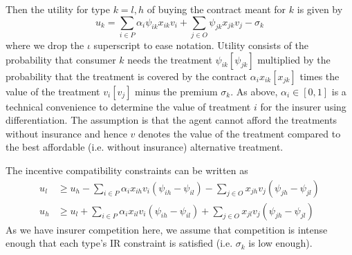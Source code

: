 \documentclass[12pt,english,a4paper]{article}
\begin{document}
Then the utility for type \(k=l,h\) of buying the contract meant for \(k\) is given by
\begin{equation}
\label{eq:11}
u_k = \sum_{i \in P} \alpha_i \psi_{ik} x_{ik} v_i + \sum_{j \in O} \psi_{jk} x_{jk} v_j - \sigma_k
\end{equation}
where we drop the \(\iota\) superscript to ease notation. Utility consists of the probability that consumer \(k\) needs the treatment \(\psi_{ik} [\psi_{jk}]\) multiplied by the probability that the treatment is covered by the contract \(\alpha_i x_{ik} [x_{jk}]\) times the value of the treatment \(v_i [v_j]\) minus the premium \(\sigma_k\). As above, \(\alpha_i \in [0,1]\) is a technical convenience to determine the value of treatment \(i\) for the insurer using differentiation. The assumption is that the agent cannot afford the treatments without insurance and hence \(v\) denotes the value of the treatment compared to the best affordable (i.e. without insurance) alternative treatment.

The incentive compatibility constraints can be written as
\begin{align}
\label{eq:12} \tag{$IC_l$}
u_l &\geq  u_h - \sum_{i \in P} \alpha_i x_{ih} v_i (\psi_{ih}-\psi_{il}) - \sum_{j \in O} x_{jh} v_j (\psi_{jh}-\psi_{jl})  \\
\label{eq:12a} \tag{$IC_h$}
u_h &\geq  u_l + \sum_{i \in P} \alpha_i x_{il} v_i (\psi_{ih}-\psi_{il}) + \sum_{j \in O} x_{jl} v_j (\psi_{jh}-\psi_{jl})
\end{align}
As we have insurer competition here, we assume that competition is intense enough that each type's IR constraint is satisfied (i.e. \(\sigma_k\) is low enough).
\end{document}
